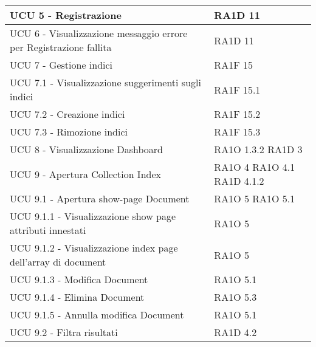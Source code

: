 \begin{center}
\begin{longtable}{ | p{5cm} | p{5cm} |}
            UCU 5 - Registrazione &  RA1D 11 \newline  \\ \hline      
            UCU 6 - Visualizzazione messaggio errore per Registrazione fallita &  RA1D 11 \newline  \\ \hline      
            UCU 7 - Gestione indici &  RA1F 15 \newline  \\ \hline      
            UCU 7.1 - Visualizzazione suggerimenti sugli indici &  RA1F 15.1 \newline  \\ \hline      
            UCU 7.2 - Creazione indici &  RA1F 15.2 \newline  \\ \hline      
            UCU 7.3  - Rimozione indici &  RA1F 15.3 \newline  \\ \hline      
            UCU 8 - Visualizzazione Dashboard &  RA1O 1.3.2 \newline  RA1D 3 \newline  \\ \hline      
            UCU 9 - Apertura Collection Index &  RA1O 4 \newline  RA1O 4.1 \newline  RA1D 4.1.2 \newline  \\ \hline      
            UCU 9.1 - Apertura show-page Document &  RA1O 5 \newline  RA1O 5.1 \newline  \\ \hline      
            UCU 9.1.1 - Visualizzazione show page attributi innestati &  RA1O 5 \newline  \\ \hline      
            UCU 9.1.2 - Visualizzazione index page dell'array di document &  RA1O 5 \newline  \\ \hline      
            UCU 9.1.3 - Modifica Document &  RA1O 5.1 \newline  \\ \hline      
            UCU 9.1.4 - Elimina Document &  RA1O 5.3 \newline  \\ \hline      
            UCU 9.1.5 - Annulla modifica Document &  RA1O 5.1 \newline  \\ \hline      
            UCU 9.2 - Filtra risultati &  RA1D 4.2 \newline  \\ \hline      

\end{longtable}
\end{center}
